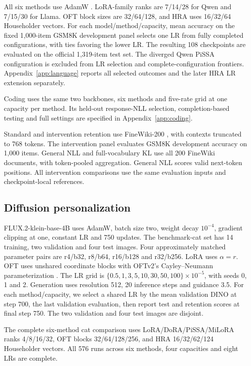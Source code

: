 All six methods use AdamW \citep{loshchilov2019adamw}. LoRA-family ranks are 7/14/28 for Qwen and 7/15/30 for Llama. OFT block sizes are 32/64/128, and HRA uses 16/32/64 Householder vectors. For each model/method/capacity, mean accuracy on the fixed 1,000-item GSM8K development panel selects one LR from fully completed configurations, with ties favoring the lower LR. The resulting 108 checkpoints are evaluated on the official 1,319-item test set. The diverged Qwen PiSSA configuration is excluded from LR selection and complete-configuration frontiers. Appendix~\ref{app:language} reports all selected outcomes and the later HRA LR extension separately.

Coding uses the same two backbones, six methods and five-rate grid at one capacity per method. Its held-out response-NLL selection, completion-based testing and full settings are specified in Appendix~\ref{app:coding}.

Standard and intervention retention use FineWiki-200 \citep{penedo2025finewiki}, with contexts truncated to 768 tokens. The intervention panel evaluates GSM8K development accuracy on 1,000 items. General NLL and full-vocabulary KL use all 200 FineWiki documents, with token-pooled aggregation. General NLL scores valid next-token positions. All intervention comparisons use the same evaluation inputs and checkpoint-local references.

\subsection{Diffusion personalization}
FLUX.2-klein-base-4B uses AdamW, batch size two, weight decay $10^{-4}$, gradient clipping at one, constant LR and 750 updates. The benchmark-cat set has 14 training, two validation and four test images. Four approximately matched parameter pairs are r4/b32, r8/b64, r16/b128 and r32/b256. LoRA uses $\alpha=r$. OFT uses unshared coordinate blocks with OFTv2's Cayley--Neumann parameterization \citep{qiu2025oftv2}. The LR grid is $\{0.5,1,3,5,10,30,50,100\}\times10^{-5}$, with seeds 0, 1 and 2. Generation uses resolution 512, 20 inference steps and guidance 3.5. For each method/capacity, we select a shared LR by the mean validation DINO at step 700, the last validation evaluation, then report test and retention scores at final step 750. The two validation and four test images are disjoint.

The complete six-method cat comparison uses LoRA/DoRA/PiSSA/MiLoRA ranks 4/8/16/32, OFT blocks 32/64/128/256, and HRA 16/32/62/124 Householder vectors. All 576 runs across six methods, four capacities and eight LRs are complete. 

